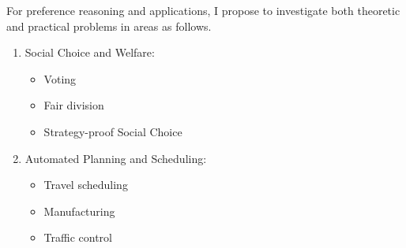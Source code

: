 For preference reasoning and applications, I propose to investigate both theoretic
and practical problems in areas as follows.
\begin{enumerate}
	\item Social Choice and Welfare\cite{arrow2010handbook,Brandt:COMSOC}:
		\begin{itemize}
			\item Voting
			\item Fair division
			\item Strategy-proof Social Choice
		\end{itemize}
	\item Automated Planning and Scheduling\cite{son2006planning,bienvenu2011specifying,bast2015route}:
		\begin{itemize}
			\item Travel scheduling
			\item Manufacturing
			\item Traffic control
		\end{itemize}
\end{enumerate}
